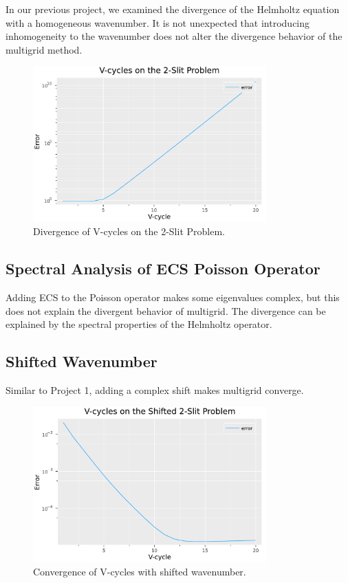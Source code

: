 \documentclass[a4paper,12pt]{article}
\begin{document}
In our previous project, we examined the divergence of the Helmholtz equation with a homogeneous wavenumber.
It is not unexpected that introducing inhomogeneity to the wavenumber does not alter the divergence behavior
of the multigrid method.

\begin{figure}[h!]
    \centering
    \includegraphics[width=0.8\textwidth]{../plots/Convergence_of_V-cycles_on_the_2-Slit_Problem.pdf}
    \caption{Divergence of V-cycles on the 2-Slit Problem.}
    \label{fig:Convergence_of_V-cycles_on_the_2-Slit_Problem}
\end{figure}

\subsection{Spectral Analysis of ECS Poisson Operator}
Adding ECS to the Poisson operator makes some eigenvalues complex, but this does not explain the
divergent behavior of multigrid. The divergence can be explained by the spectral properties of the Helmholtz
operator.

\subsection{Shifted Wavenumber}
Similar to Project 1, adding a complex shift makes multigrid converge.
\begin{figure}[h!]
    \centering
    \includegraphics[width=0.8\textwidth]{../plots/Vcycles_shifted2slit.pdf}
    \caption{Convergence of V-cycles with shifted wavenumber.}
    \label{fig:../plots/Vcycles_shifted2slit.pdf}
\end{figure}
\end{document}
